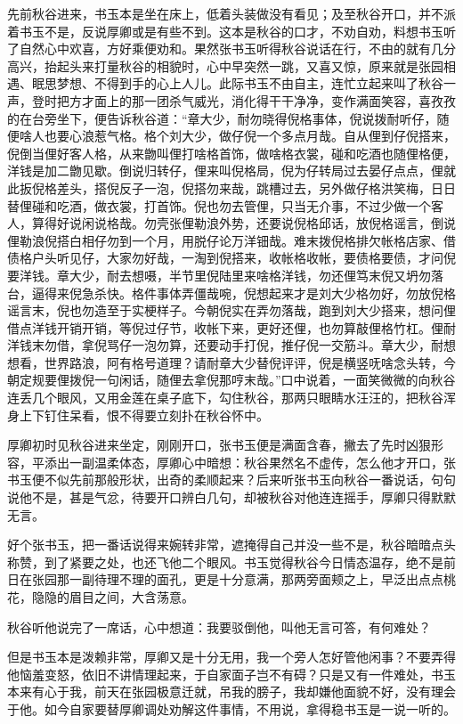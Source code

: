 \documentclass[12pt,UTF8]{ctexbook}
\begin{document}
{{{先前秋谷进来，书玉本是坐在床上，低着头装做没有看见；及至秋谷开口，并不派着书玉不是，反说厚卿或是有些不到。这本是秋谷的口才，不劝自劝，料想书玉听了自然心中欢喜，方好乘便劝和。果然张书玉听得秋谷说话在行，不由的就有几分高兴，抬起头来打量秋谷的相貌时，心中早突然一跳，又喜又惊，原来就是张园相遇、眠思梦想、不得到手的心上人儿。此际书玉不由自主，连忙立起来叫了秋谷一声，登时把方才面上的那一团杀气威光，消化得干干净净，变作满面笑容，喜孜孜的在台旁坐下，便告诉秋谷道：“章大少，耐勿晓得倪格事体，倪说拨耐听仔，随便啥人也要心浪惹气格。格个刘大少，做仔倪一个多点月哉。自从俚到仔倪搭来，倪倒当俚好客人格，从来朆叫俚打啥格首饰，做啥格衣裳，碰和吃酒也随俚格便，洋钱是加二朆见歇。倒说归转仔，俚来叫倪格局，倪为仔转局过去晏仔点点，俚就此扳倪格差头，搭倪反子一泡，倪搭勿来哉，跳槽过去，另外做仔格洪笑梅，日日替俚碰和吃酒，做衣裳，打首饰。倪也勿去管俚，只当无介事，不过少做一个客人，算得好说闲说格哉。勿壳张俚勒浪外势，还要说倪格邱话，放倪格谣言，倒说俚勒浪倪搭白相仔勿到一个月，用脱仔论万洋钿哉。难末拨倪格排欠帐格店家、借债格户头听见仔，大家勿好哉，一淘到倪搭来，收帐格收帐，要债格要债，才问倪要洋钱。章大少，耐去想嗫，半节里倪陆里来啥格洋钱，勿还俚笃末倪又坍勿落台，逼得来倪急杀快。格件事体弄僵哉啘，倪想起来才是刘大少格勿好，勿放倪格谣言末，倪也勿造至于实梗样子。今朝倪实在弄勿落哉，跑到刘大少搭来，想问俚借点洋钱开销开销，等倪过仔节，收帐下来，更好还俚，也勿算敲俚格竹杠。俚耐洋钱末勿借，拿倪骂仔一泡勿算，还要动手打倪，推仔倪一交筋斗。章大少，耐想想看，世界路浪，阿有格号道理？请耐章大少替倪评评，倪是横竖呒啥念头转，今朝定规要俚拨倪一句闲话，随俚去拿倪那哼末哉。”口中说着，一面笑微微的向秋谷连丢几个眼风，又用金莲在桌子底下，勾住秋谷，那两只眼睛水汪汪的，把秋谷浑身上下钉住呆看，恨不得要立刻扑在秋谷怀中。

厚卿初时见秋谷进来坐定，刚刚开口，张书玉便是满面含春，撇去了先时凶狠形容，平添出一副温柔体态，厚卿心中暗想：秋谷果然名不虚传，怎么他才开口，张书玉便不似先前那般形状，出奇的柔顺起来？后来听张书玉向秋谷一番说话，句句说他不是，甚是气忿，待要开口辨白几句，却被秋谷对他连连摇手，厚卿只得默默无言。

好个张书玉，把一番话说得来婉转非常，遮掩得自己并没一些不是，秋谷暗暗点头称赞，到了紧要之处，也还飞他二个眼风。书玉觉得秋谷今日情态温存，绝不是前日在张园那一副待理不理的面孔，更是十分意满，那两旁面颊之上，早泛出点点桃花，隐隐的眉目之间，大含荡意。

秋谷听他说完了一席话，心中想道：我要驳倒他，叫他无言可答，有何难处？

但是书玉本是泼赖非常，厚卿又是十分无用，我一个旁人怎好管他闲事？不要弄得他恼羞变怒，依旧不讲情理起来，于自家面子岂不有碍？只是又有一件难处，书玉本来有心于我，前天在张园极意迁就，吊我的膀子，我却嫌他面貌不好，没有理会于他。如今自家要替厚卿调处劝解这件事情，不用说，拿得稳书玉是一说一听的。

}}}
\end{document}
